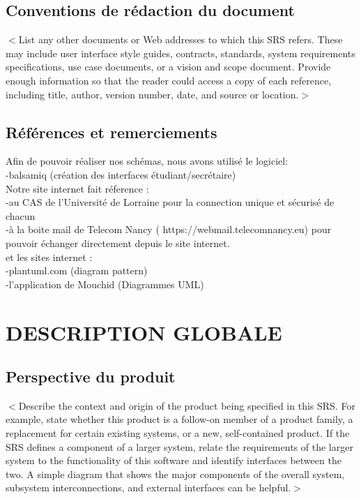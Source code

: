 \documentclass{scrreprt}
\begin{document}
\section{Conventions de rédaction du document}
$<$List any other documents or Web addresses to which this SRS refers. These may 
include user interface style guides, contracts, standards, system requirements 
specifications, use case documents, or a vision and scope document. Provide 
enough information so that the reader could access a copy of each reference, 
including title, author, version number, date, and source or location.$>$

\section{Références et remerciements}
Afin de pouvoir réaliser nos schémas, nous avons utilisé le logiciel$:$ \\
 -balsamiq (création des interfaces étudiant/secrétaire) \\

Notre site internet fait réference :\\

-au CAS de l'Université de Lorraine pour la connection unique et sécurisé de chacun\\
-à la boite mail de Telecom Nancy ( https://webmail.telecomnancy.eu) pour pouvoir échanger directement depuis le site internet.\\
	
	
		et les sites internet $:$\\

-plantuml.com (diagram pattern)\\
-l'application de Mouchid (Diagrammes UML)\\


\chapter{DESCRIPTION GLOBALE }

\section{Perspective du produit}
$<$Describe the context and origin of the product being specified in this SRS.  
For example, state whether this product is a follow-on member of a product 
family, a replacement for certain existing systems, or a new, self-contained 
product. If the SRS defines a component of a larger system, relate the 
requirements of the larger system to the functionality of this software and 
identify interfaces between the two. A simple diagram that shows the major 
components of the overall system, subsystem interconnections, and external 
interfaces can be helpful.$>$
\end{document}
